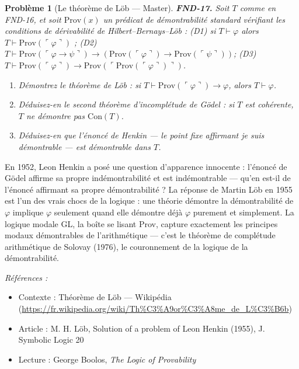 \documentclass[11pt]{article}
\newtheorem{problem}{Problème}
\newenvironment{refs}{\par\small\noindent\emph{Références :}\begin{itemize}\setlength\itemsep{0pt}}{\end{itemize}\normalsize}
\begin{document}
\bigskip

\begin{problem}[{Le théorème de Löb --- Master}]
\textbf{FND-17.} Soit $ T $ comme en FND-16, et soit
$ \mathrm{Prov}(x) $ un prédicat de démontrabilité standard vérifiant les
conditions de dérivabilité de Hilbert--Bernays--Löb : (D1) si $ T \vdash \varphi $ alors
$ T \vdash \mathrm{Prov}(\ulcorner \varphi \urcorner) $ ;
(D2) $ T \vdash \mathrm{Prov}(\ulcorner \varphi \to \psi \urcorner) \to
(\mathrm{Prov}(\ulcorner \varphi \urcorner) \to \mathrm{Prov}(\ulcorner \psi \urcorner)) $;
(D3) $ T \vdash \mathrm{Prov}(\ulcorner \varphi \urcorner) \to
\mathrm{Prov}(\ulcorner \mathrm{Prov}(\ulcorner \varphi \urcorner) \urcorner) $.
\begin{enumerate}
\item[(a)] Démontrez le théorème de Löb : si $ T \vdash \mathrm{Prov}(\ulcorner \varphi \urcorner) \to
\varphi $, alors $ T \vdash \varphi $.
\item[(b)] Déduisez-en le second théorème d'incomplétude de Gödel : si
$ T $ est cohérente, $ T $ ne démontre pas $ \mathrm{Con}(T) $.
\item[(c)] Déduisez-en que l'énoncé
de Henkin --- le point fixe affirmant \og{} je suis démontrable \fg{} --- est démontrable dans $ T $.
\end{enumerate}

\end{problem}

\noindent En 1952, Leon Henkin a posé une question d'apparence innocente : l'énoncé de
Gödel affirme sa propre indémontrabilité et est indémontrable --- qu'en est-il de l'énoncé affirmant
sa propre démontrabilité ? La réponse de Martin Löb en 1955 est l'un des vrais chocs de la
logique : une théorie démontre \og{} la démontrabilité de $\varphi$ implique $\varphi$ \fg{} seulement quand elle démontre
déjà $\varphi$ purement et simplement. La logique modale GL, la boîte se lisant Prov, capture exactement
les principes modaux démontrables de l'arithmétique --- c'est le théorème de complétude arithmétique
de Solovay (1976), le couronnement de la logique de la démontrabilité.

\begin{refs}
\item Contexte : Théorème de Löb --- Wikipédia (\url{https://fr.wikipedia.org/wiki/Th%C3%A9or%C3%A8me_de_L%C3%B6b})
\item Article : M. H. Löb, \og{} Solution of a problem of Leon Henkin \fg{} (1955), J. Symbolic Logic 20
\item Lecture : George Boolos, \textit{The Logic of Provability}
\end{refs}
\end{document}
